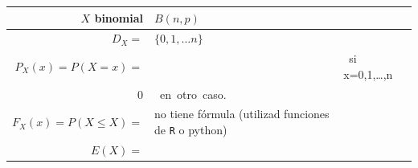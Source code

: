 \documentclass[]{book}
\begin{document}
\begin{longtable}[]{@{}rll@{}}
\toprule
\begin{minipage}[b]{0.41\columnwidth}\raggedleft
\(X\) binomial\strut
\end{minipage} & \begin{minipage}[b]{0.26\columnwidth}\raggedright
\(B(n,p)\)\strut
\end{minipage} & \begin{minipage}[b]{0.24\columnwidth}\raggedright
\strut
\end{minipage}\tabularnewline
\midrule
\endhead
\begin{minipage}[t]{0.41\columnwidth}\raggedleft
\(D_X=\)\strut
\end{minipage} & \begin{minipage}[t]{0.26\columnwidth}\raggedright
\(\{0,1,\ldots n\}\)\strut
\end{minipage} & \begin{minipage}[t]{0.24\columnwidth}\raggedright
\strut
\end{minipage}\tabularnewline
\begin{minipage}[t]{0.41\columnwidth}\raggedleft
\(P_X(x)=P(X=x)=\)\strut
\end{minipage} & \begin{minipage}[t]{0.26\columnwidth}\raggedright
\(\left\{\begin{array}{ll}{n\choose x}\cdot p^x\cdot (1-p)^{n-x} & \mbox{ si } x=0,1,\ldots,n\\0 & \mbox{ en otro caso.}\end{array}\right.\)\strut
\end{minipage} & \begin{minipage}[t]{0.24\columnwidth}\raggedright
\strut
\end{minipage}\tabularnewline
\begin{minipage}[t]{0.41\columnwidth}\raggedleft
\(F_X(x)=P(X\leq X)=\)\strut
\end{minipage} & \begin{minipage}[t]{0.26\columnwidth}\raggedright
no tiene fórmula (utilizad funciones de \texttt{R} o python)\strut
\end{minipage} & \begin{minipage}[t]{0.24\columnwidth}\raggedright
\strut
\end{minipage}\tabularnewline
\begin{minipage}[t]{0.41\columnwidth}\raggedleft
\(E(X)=\)\strut
\end{minipage} & \begin{minipage}[t]{0.26\columnwidth}\raggedright

\end{minipage}
\end{longtable}
\end{document}
